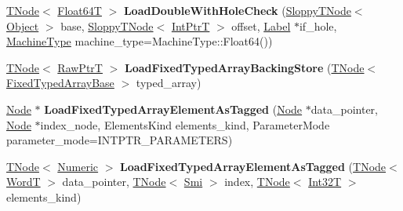 \begin{DoxyCompactItemize}
\item 
\mbox{\label{classv8_1_1internal_1_1CodeStubAssembler_a2f999871bbe15bf44c587929e9f285ae}} 
\mbox{\hyperlink{classv8_1_1internal_1_1compiler_1_1TNode}{T\+Node}}$<$ \mbox{\hyperlink{structv8_1_1internal_1_1Float64T}{Float64T}} $>$ {\bfseries Load\+Double\+With\+Hole\+Check} (\mbox{\hyperlink{classv8_1_1internal_1_1compiler_1_1SloppyTNode}{Sloppy\+T\+Node}}$<$ \mbox{\hyperlink{classv8_1_1internal_1_1Object}{Object}} $>$ base, \mbox{\hyperlink{classv8_1_1internal_1_1compiler_1_1SloppyTNode}{Sloppy\+T\+Node}}$<$ \mbox{\hyperlink{structv8_1_1internal_1_1IntPtrT}{Int\+PtrT}} $>$ offset, \mbox{\hyperlink{classv8_1_1internal_1_1compiler_1_1CodeAssemblerLabel}{Label}} $\ast$if\+\_\+hole, \mbox{\hyperlink{classv8_1_1internal_1_1MachineType}{Machine\+Type}} machine\+\_\+type=Machine\+Type\+::\+Float64())
\item 
\mbox{\label{classv8_1_1internal_1_1CodeStubAssembler_ab9d9a2e7a9e8907f926f073a44efbd47}} 
\mbox{\hyperlink{classv8_1_1internal_1_1compiler_1_1TNode}{T\+Node}}$<$ \mbox{\hyperlink{structv8_1_1internal_1_1RawPtrT}{Raw\+PtrT}} $>$ {\bfseries Load\+Fixed\+Typed\+Array\+Backing\+Store} (\mbox{\hyperlink{classv8_1_1internal_1_1compiler_1_1TNode}{T\+Node}}$<$ \mbox{\hyperlink{classv8_1_1internal_1_1FixedTypedArrayBase}{Fixed\+Typed\+Array\+Base}} $>$ typed\+\_\+array)
\item 
\mbox{\label{classv8_1_1internal_1_1CodeStubAssembler_a4f003e5804626452297b56f0a200d932}} 
\mbox{\hyperlink{classv8_1_1internal_1_1compiler_1_1Node}{Node}} $\ast$ {\bfseries Load\+Fixed\+Typed\+Array\+Element\+As\+Tagged} (\mbox{\hyperlink{classv8_1_1internal_1_1compiler_1_1Node}{Node}} $\ast$data\+\_\+pointer, \mbox{\hyperlink{classv8_1_1internal_1_1compiler_1_1Node}{Node}} $\ast$index\+\_\+node, Elements\+Kind elements\+\_\+kind, Parameter\+Mode parameter\+\_\+mode=I\+N\+T\+P\+T\+R\+\_\+\+P\+A\+R\+A\+M\+E\+T\+E\+RS)
\item 
\mbox{\label{classv8_1_1internal_1_1CodeStubAssembler_a7fb1087a51545910ce3eac3176ca40dd}} 
\mbox{\hyperlink{classv8_1_1internal_1_1compiler_1_1TNode}{T\+Node}}$<$ \mbox{\hyperlink{structv8_1_1internal_1_1UnionT}{Numeric}} $>$ {\bfseries Load\+Fixed\+Typed\+Array\+Element\+As\+Tagged} (\mbox{\hyperlink{classv8_1_1internal_1_1compiler_1_1TNode}{T\+Node}}$<$ \mbox{\hyperlink{structv8_1_1internal_1_1WordT}{WordT}} $>$ data\+\_\+pointer, \mbox{\hyperlink{classv8_1_1internal_1_1compiler_1_1TNode}{T\+Node}}$<$ \mbox{\hyperlink{classv8_1_1internal_1_1Smi}{Smi}} $>$ index, \mbox{\hyperlink{classv8_1_1internal_1_1compiler_1_1TNode}{T\+Node}}$<$ \mbox{\hyperlink{structv8_1_1internal_1_1Int32T}{Int32T}} $>$ elements\+\_\+kind)

\end{DoxyCompactItemize}
